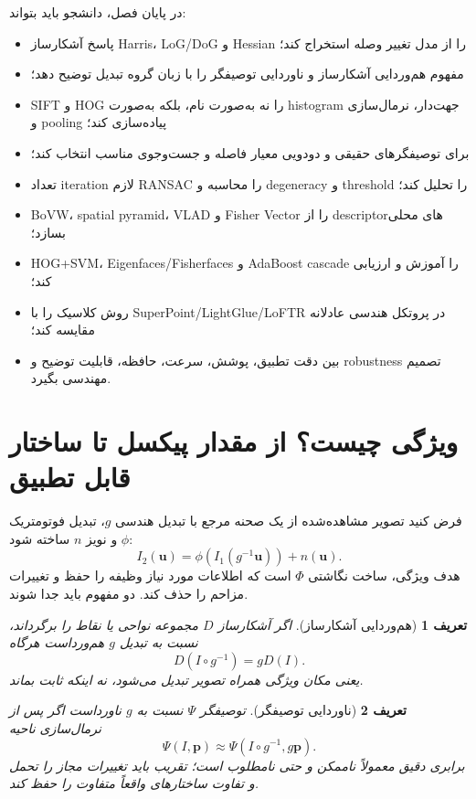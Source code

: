 \documentclass[12pt,openany,oneside]{book}
\newtheorem{definition}{تعریف}[chapter]
\newcommand{\vect}[1]{\bm{#1}}
\begin{document}
\begin{learningbox}
در پایان فصل، دانشجو باید بتواند:
\begin{itemize}
\item پاسخ آشکارساز Harris، LoG/DoG و Hessian را از مدل تغییر وصله استخراج کند؛
\item مفهوم هم‌وردایی آشکارساز و ناوردایی توصیفگر را با زبان گروه تبدیل توضیح دهد؛
\item SIFT و HOG را نه به‌صورت نام، بلکه به‌صورت histogram جهت‌دار، نرمال‌سازی و pooling پیاده‌سازی کند؛
\item برای توصیفگرهای حقیقی و دودویی معیار فاصله و جست‌وجوی مناسب انتخاب کند؛
\item تعداد iteration لازم RANSAC را محاسبه و degeneracy و threshold را تحلیل کند؛
\item BoVW، spatial pyramid، VLAD و Fisher Vector را از descriptorهای محلی بسازد؛
\item HOG+SVM، Eigenfaces/Fisherfaces و AdaBoost cascade را آموزش و ارزیابی کند؛
\item روش کلاسیک را با SuperPoint/LightGlue/LoFTR در پروتکل هندسی عادلانه مقایسه کند؛
\item بین دقت تطبیق، پوشش، سرعت، حافظه، قابلیت توضیح و robustness تصمیم مهندسی بگیرد.
\end{itemize}
\end{learningbox}

\section{ویژگی چیست؟ از مقدار پیکسل تا ساختار قابل تطبیق}
فرض کنید تصویر مشاهده‌شده از یک صحنه مرجع با تبدیل هندسی $g$، تبدیل فوتومتریک $\phi$ و نویز $n$ ساخته شود:
\begin{equation}
I_2(\vect u)=\phi\!\left(I_1(g^{-1}\vect u)\right)+n(\vect u).
\label{eq:formation_feature}
\end{equation}
هدف ویژگی، ساخت نگاشتی $\Phi$ است که اطلاعات مورد نیاز وظیفه را حفظ و تغییرات مزاحم را حذف کند. دو مفهوم باید جدا شوند.

\begin{definition}[هم‌وردایی آشکارساز]
اگر آشکارساز $D$ مجموعه نواحی یا نقاط را برگرداند، نسبت به تبدیل $g$ هم‌ورداست هرگاه
\[
D(I\circ g^{-1})=gD(I).
\]
یعنی مکان ویژگی همراه تصویر تبدیل می‌شود، نه اینکه ثابت بماند.
\end{definition}

\begin{definition}[ناوردایی توصیفگر]
توصیفگر $\Psi$ نسبت به $g$ ناورداست اگر پس از نرمال‌سازی ناحیه
\[
\Psi(I,\vect p)\approx \Psi(I\circ g^{-1},g\vect p).
\]
برابری دقیق معمولاً ناممکن و حتی نامطلوب است؛ تقریب باید تغییرات مجاز را تحمل و تفاوت ساختارهای واقعاً متفاوت را حفظ کند.
\end{definition}
\end{document}
